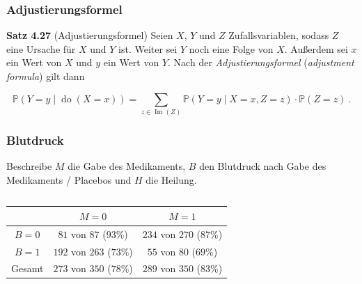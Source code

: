 \documentclass{beamer}
\newcommand{\en}[1]{{\scriptsize(\textit{#1})}}
\newcommand{\Do}{\operatorname{do}}
\newcommand{\Bild}{\operatorname{Im}}
\newcommand{\klein}[1]{{\scriptsize #1}}
\begin{document}
\begin{frame}
\frametitle{Adjustierungsformel}

\begin{block}{\textbf{Satz 4.27} \klein{(Adjustierungsformel)}}
Seien $X$, $Y$ und $Z$ Zufallsvariablen, sodass $Z$ eine Ursache für $X$ und $Y$ ist. Weiter sei $Y$ noch eine Folge von $X$. Außerdem sei $x$ ein Wert von $X$ und $y$ ein Wert von $Y$. Nach der \textit{Adjustierungsformel} \en{adjustment formula} gilt dann
\begin{small}
\[\mathbb{P}(Y = y \mid \Do(X = x)) = \sum_{z \in \Bild(Z)} \mathbb{P}(Y = y \mid X = x, Z = z) \cdot \mathbb{P}(Z = z)~.\]
\end{small}
\end{block}
\end{frame}

\begin{frame}
\frametitle{Blutdruck}

Beschreibe $M$ die Gabe des Medikaments, $B$ den Blutdruck nach Gabe des Medikaments / Placebos und $H$ die Heilung.

\begin{columns}
\begin{column}{0.7\linewidth}
\begin{scriptsize}
\begin{center}
\begin{tabular}{| c | c | c |}
\hline
& $M = 0$ & $M = 1$\\
\hline
$B = 0$ & $81$ von $87$ ($93 \%$) & $234$ von $270$ ($87 \%$)\\
\hline
$B = 1$ & $192$ von $263$ ($73 \%$) & $55$ von $80$ ($69 \%$)\\
\hline
Gesamt & $273$ von $350$ ($78 \%$) & $289$ von $350$ ($83 \%$)\\
\hline
\end{tabular}
\end{center}
\end{scriptsize}
\end{column}
\pause
\begin{column}{0.3\linewidth}
\begin{center}
\begin{scriptsize}
\end{scriptsize}
\end{center}
\end{column}
\end{columns}
\end{frame}
\end{document}
